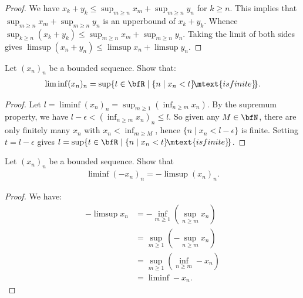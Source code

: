 \documentclass[10pt,twoside,openany]{memoir}
\begin{document}
        \begin{proof}
            We have $x_k + y_k \leq \sup_{m \geq n}x_m + \sup_{m \geq n}y_n$ for $k \geq n$. This implies that $\sup_{m \geq n}x_m + \sup_{m \geq  n}y_n$ is an upperbound of $x_k + y_k$. Whence $\sup_{k \geq n}(x_k + y_k) \leq \sup_{m \geq n}x_m + \sup_{m \geq  n}y_n$. Taking the limit of both sides gives $\limsup (x_n + y_n) \leq \limsup x_n + \limsup y_n$.
        \end{proof}
    \begin{exercise}
        Let $(x_n)_n$ be a bounded sequence. Show that:
            \begin{equation*}
            \begin{split}
                \liminf(x_n)_n = \sup\{t \in \bfR \mid \{n \mid x_n < t \} \hspace{-2pt}\mtext{is finite}\hspace{-2pt}\}.
            \end{split}
            \end{equation*}
    \end{exercise}
        \begin{proof}
            Let $l = \liminf(x_n)_n = \sup_{m \geq 1}(\inf_{n \geq m}x_n)$. By the supremum property, we have $l - \epsilon < (\inf_{n \geq m} x_n)_n \leq l$. So given any $M \in \bfN$, there are only finitely many $x_n$ with $x_n < \inf_{m \geq M}$, hence $\{n \mid x_n < l - \epsilon\}$ is finite. Setting $t = l - \epsilon$ gives $l = \sup\{t \in \bfR \mid \{n \mid x_n < t \} \hspace{-2pt}\mtext{is finite}\hspace{-2pt}\}$.
        \end{proof}
    \begin{exercise}
        Let $(x_n)_n$ be a bounded sequence. Show that
            \begin{equation*}
            \begin{split}
                \liminf(-x_n)_n = -\limsup(x_n)_n.
            \end{split}
            \end{equation*}
    \end{exercise}
        \begin{proof}
            We have:
                \begin{equation*}
                \begin{split}
                    -\limsup x_n 
                    & = -\inf_{m\geq 1}(\sup_{n \geq m}x_n) \\
                    & = \sup_{m \geq 1}(-\sup_{n \geq m}x_n) \\
                    & = \sup_{m \geq 1}(\inf_{n \geq m}-x_n) \\
                    & = \liminf -x_n.
                \end{split}
                \end{equation*}
        \end{proof}
\end{document}
